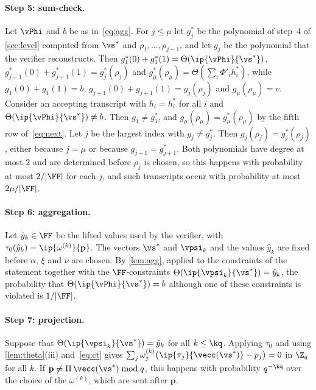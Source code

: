 \paragraph{Step 5: sum-check.}
Let $\vPhi$ and $b$ be as in~\eqref{eq:agg}. For $j\le\mu$ let $g_j^*$ be the polynomial of step~4 of \cref{sec:level} computed from $\vs^*$ and $\rho_1,\dots,\rho_{j-1}$, and let $g_j$ be the polynomial that the verifier reconstructs. Then $g_1^*(0)+g_1^*(1)=\Theta(\ip{\vPhi}{\vs^*})$, $g^*_{j+1}(0)+g^*_{j+1}(1)=g_j^*(\rho_j)$ and $g^*_\mu(\rho_\mu)=\Theta(\sum_i\Phi'_ih^*_i)$, while $g_1(0)+g_1(1)=b$, $g_{j+1}(0)+g_{j+1}(1)=g_j(\rho_j)$ and $g_\mu(\rho_\mu)=v$. Consider an accepting transcript with $h_i=h_i^*$ for all $i$ and $\Theta(\ip{\vPhi}{\vs^*})\ne b$. Then $g_1\ne g_1^*$, and $g_\mu(\rho_\mu)=g^*_\mu(\rho_\mu)$ by the fifth row of~\eqref{eq:next}. Let $j$ be the largest index with $g_j\ne g_j^*$. Then $g_j(\rho_j)=g_j^*(\rho_j)$, either because $j=\mu$ or because $g_{j+1}=g_{j+1}^*$. Both polynomials have degree at most $2$ and are determined before $\rho_j$ is chosen, so this happens with probability at most $2/\lvert\FF\rvert$ for each $j$, and such transcripts occur with probability at most $2\mu/\lvert\FF\rvert$.

\paragraph{Step 6: aggregation.}
Let $\hat y_k\in\FF$ be the lifted values used by the verifier, with $\tau_0(\hat y_k)=\ip{\omega^{(k)}}{\mathbf p}$. The vectors $\vs^*$ and $\vpsi_k$ and the values $\hat y_k$ are fixed before $\alpha$, $\xi$ and $\nu$ are chosen. By \cref{lem:agg}, applied to the constraints of the statement together with the $\FF$-constraints $\Theta(\ip{\vpsi_k}{\vs^*})=\hat y_k$, the probability that $\Theta(\ip{\vPhi}{\vs^*})=b$ although one of these constraints is violated is $1/\lvert\FF\rvert$.

\paragraph{Step 7: projection.}
Suppose that $\Theta(\ip{\vpsi_k}{\vs^*})=\hat y_k$ for all $k\le\kq$. Applying $\tau_0$ and using \cref{lem:theta}(iii) and~\eqref{eq:ct} gives $\sum_j\omega^{(k)}_j\bigl(\ip{\pi_j}{\vecc(\vs^*)}-p_j\bigr)=0$ in $\Z_q$ for all $k$. If $\mathbf p\ne\Pi\,\vecc(\vs^*)\bmod q$, this happens with probability $q^{-\kq}$ over the choice of the $\omega^{(k)}$, which are sent after $\mathbf p$.

